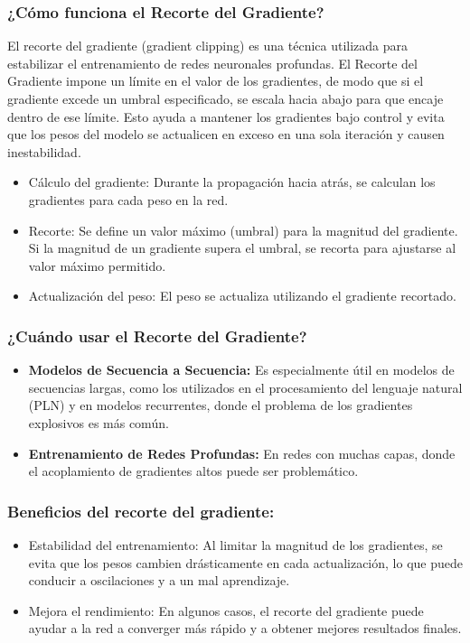 \documentclass[11pt]{article}
\begin{document}
\subsubsection{¿Cómo funciona el Recorte del Gradiente?}
\label{sec:org68ca849}
El recorte del gradiente (gradient clipping) es una técnica utilizada
para estabilizar el entrenamiento de redes neuronales profundas. El
Recorte del Gradiente impone un límite en el valor de los gradientes, de
modo que si el gradiente excede un umbral especificado, se escala hacia
abajo para que encaje dentro de ese límite. Esto ayuda a mantener los
gradientes bajo control y evita que los pesos del modelo se actualicen
en exceso en una sola iteración y causen inestabilidad.

\begin{itemize}
\item Cálculo del gradiente: Durante la propagación hacia atrás, se calculan
los gradientes para cada peso en la red.
\item Recorte: Se define un valor máximo (umbral) para la magnitud del
gradiente. Si la magnitud de un gradiente supera el umbral, se recorta
para ajustarse al valor máximo permitido.
\item Actualización del peso: El peso se actualiza utilizando el gradiente
recortado.
\end{itemize}

\subsubsection{¿Cuándo usar el Recorte del Gradiente?}
\label{sec:orgb454d02}
\begin{itemize}
\item \textbf{Modelos de Secuencia a Secuencia:} Es especialmente útil en modelos
de secuencias largas, como los utilizados en el procesamiento del
lenguaje natural (PLN) y en modelos recurrentes, donde el problema de
los gradientes explosivos es más común.
\item \textbf{Entrenamiento de Redes Profundas:} En redes con muchas capas, donde
el acoplamiento de gradientes altos puede ser problemático.
\end{itemize}

\subsubsection{Beneficios del recorte del gradiente:}
\label{sec:orgbe0909f}
\begin{itemize}
\item Estabilidad del entrenamiento: Al limitar la magnitud de los
gradientes, se evita que los pesos cambien drásticamente en cada
actualización, lo que puede conducir a oscilaciones y a un mal
aprendizaje.
\item Mejora el rendimiento: En algunos casos, el recorte del gradiente
puede ayudar a la red a converger más rápido y a obtener mejores
resultados finales.
\end{itemize}
\end{document}
